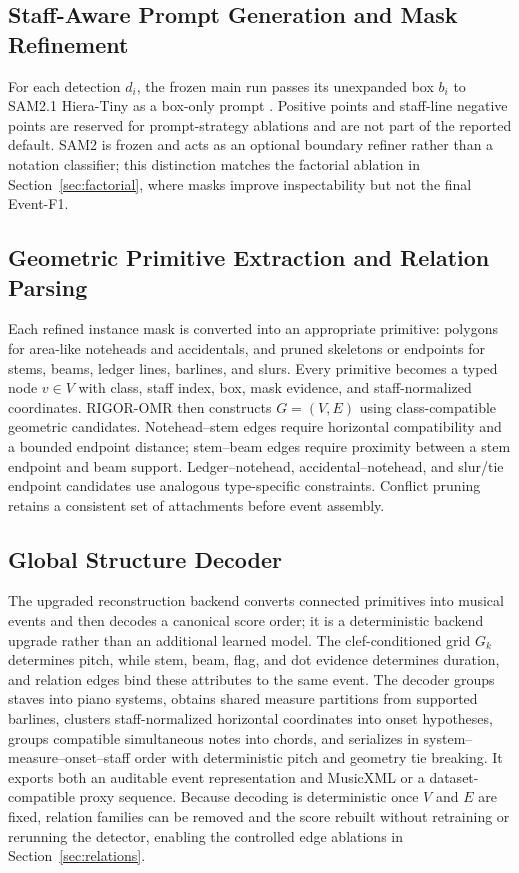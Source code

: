 \subsection{Staff-Aware Prompt Generation and Mask Refinement}
For each detection $d_i$, the frozen main run passes its unexpanded box $b_i$ to SAM2.1 Hiera-Tiny as a box-only prompt \cite{ravi2025sam2}. Positive points and staff-line negative points are reserved for prompt-strategy ablations and are not part of the reported default. SAM2 is frozen and acts as an optional boundary refiner rather than a notation classifier; this distinction matches the factorial ablation in Section~\ref{sec:factorial}, where masks improve inspectability but not the final Event-F1.

\subsection{Geometric Primitive Extraction and Relation Parsing}
Each refined instance mask is converted into an appropriate primitive: polygons for area-like noteheads and accidentals, and pruned skeletons or endpoints for stems, beams, ledger lines, barlines, and slurs. Every primitive becomes a typed node $v\in V$ with class, staff index, box, mask evidence, and staff-normalized coordinates. RIGOR-OMR then constructs $G=(V,E)$ using class-compatible geometric candidates. Notehead--stem edges require horizontal compatibility and a bounded endpoint distance; stem--beam edges require proximity between a stem endpoint and beam support. Ledger--notehead, accidental--notehead, and slur/tie endpoint candidates use analogous type-specific constraints. Conflict pruning retains a consistent set of attachments before event assembly.

\subsection{Global Structure Decoder}
The upgraded reconstruction backend converts connected primitives into musical events and then decodes a canonical score order; it is a deterministic backend upgrade rather than an additional learned model. The clef-conditioned grid $G_k$ determines pitch, while stem, beam, flag, and dot evidence determines duration, and relation edges bind these attributes to the same event. The decoder groups staves into piano systems, obtains shared measure partitions from supported barlines, clusters staff-normalized horizontal coordinates into onset hypotheses, groups compatible simultaneous notes into chords, and serializes in system--measure--onset--staff order with deterministic pitch and geometry tie breaking. It exports both an auditable event representation and MusicXML or a dataset-compatible proxy sequence. Because decoding is deterministic once $V$ and $E$ are fixed, relation families can be removed and the score rebuilt without retraining or rerunning the detector, enabling the controlled edge ablations in Section~\ref{sec:relations}.

\FloatBarrier
